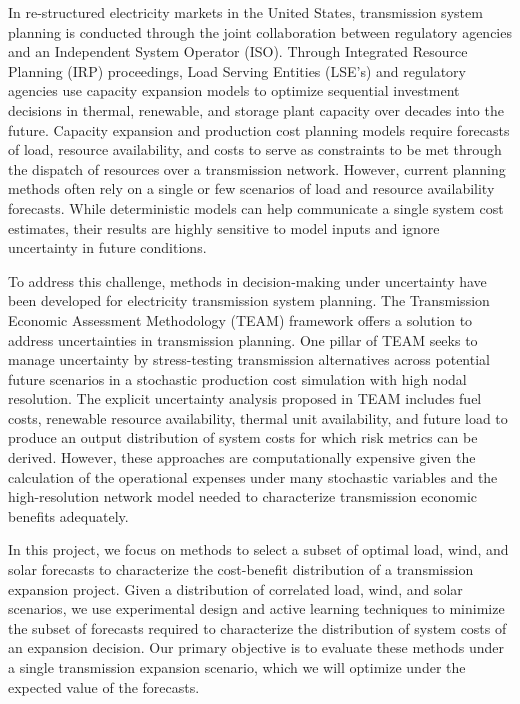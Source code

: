 \documentclass[10pt,twocolumn,letterpaper]{article}
\begin{document}
In re-structured electricity markets in the United States, transmission system planning is conducted through the joint collaboration between regulatory agencies and an Independent System Operator (ISO)\cite{grid_lab_transmission_2023}. Through Integrated Resource Planning (IRP) proceedings, Load Serving Entities (LSE's) and regulatory agencies use capacity expansion models to optimize sequential investment decisions in thermal, renewable, and storage plant capacity over decades into the future\cite{hobbs_adaptive_2016}. Capacity expansion and production cost planning models require forecasts of load, resource availability, and costs to serve as constraints to be met through the dispatch of resources over a transmission network. However, current planning methods often rely on a single or few scenarios of load and resource availability forecasts. While deterministic models can help communicate a single system cost estimates, their results are highly sensitive to model inputs and ignore uncertainty in future conditions. 

To address this challenge, methods in decision-making under uncertainty have been developed for electricity transmission system planning. The Transmission Economic Assessment Methodology (TEAM)\cite{zhang_using_2010} framework offers a solution to address uncertainties in transmission planning. One pillar of TEAM seeks to manage uncertainty by stress-testing transmission alternatives across potential future scenarios in a stochastic production cost simulation with high nodal resolution. The explicit uncertainty analysis proposed in TEAM includes fuel costs, renewable resource availability, thermal unit availability, and future load to produce an output distribution of system costs for which risk metrics can be derived. However, these approaches are computationally expensive given the calculation of the operational expenses under many stochastic variables and the high-resolution network model needed to characterize transmission economic benefits adequately.

In this project, we focus on methods to select a subset of optimal load, wind, and solar forecasts to characterize the cost-benefit distribution of a transmission expansion project. Given a distribution of correlated load, wind, and solar scenarios, we use experimental design and active learning techniques to minimize the subset of forecasts required to characterize the distribution of system costs of an expansion decision. Our primary objective is to evaluate these methods under a single transmission expansion scenario, which we will optimize under the expected value of the forecasts. 
\end{document}
